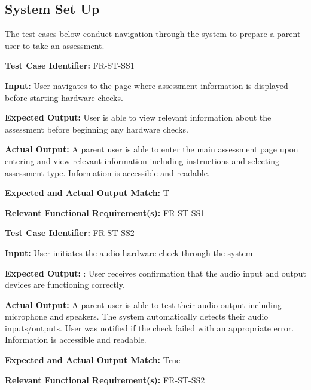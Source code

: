 \documentclass[12pt, titlepage]{article}
\begin{document}
\newpage{}

\subsection{System Set Up}
\hspace{2em}The test cases below conduct navigation through the system to prepare a parent user to take an assessment. 

\begin{mdframed}[linewidth=0.5mm] \par
  \textbf{Test Case Identifier:} FR-ST-SS1 \par
  \textbf{Input:} User navigates to the page where assessment information is displayed
before starting hardware checks. \par
  \textbf{Expected Output:} User is able to view relevant information about the assessment before
  beginning any hardware checks. \par
  \textbf{Actual Output:} A parent user is able to enter the main assessment page upon entering and view relevant information including instructions and selecting assessment type. 
  Information is accessible and readable. \par
  \textbf{Expected and Actual Output Match:} T \par
  \textbf{Relevant Functional Requirement(s):} FR-ST-SS1
\end{mdframed}

\begin{mdframed}[linewidth=0.5mm] \par
  \textbf{Test Case Identifier:} FR-ST-SS2 \par
  \textbf{Input:} User initiates the audio hardware check through the system \par
  \textbf{Expected Output:} : User receives confirmation that the audio input and output devices are
  functioning correctly. \par
  \textbf{Actual Output:} A parent user is able to test their audio output including microphone and speakers. The system automatically detects their audio inputs/outputs. 
  User was notified if the check failed with an appropriate error. 
  Information is accessible and readable. \par
  \textbf{Expected and Actual Output Match:} True \par
  \textbf{Relevant Functional Requirement(s):} FR-ST-SS2
\end{mdframed}
\end{document}
